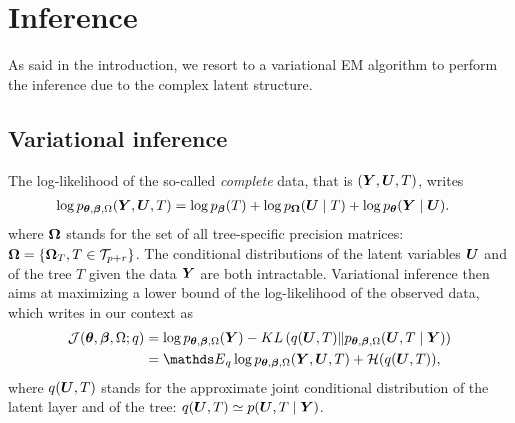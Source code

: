 \section{Inference} \label{sec:Inference}

As said in the introduction, we  resort to a variational EM algorithm to perform the inference due to the complex latent structure.

\subsection{Variational inference}

The log-likelihood of the so-called {\sl complete} data, that is $({\boldsymbol{Y}}, {\boldsymbol{U}}, T)$, writes
\begin{align*}
\log p_{{\boldsymbol{\theta}}, {\boldsymbol{\beta}}, \Omega}({\boldsymbol{Y}}, {\boldsymbol{U}}, T) 
& = \log p_{\boldsymbol{\beta}}(T) + \log p_{{\boldsymbol{\Omega}}}({\boldsymbol{U}} \mid T) + \log p_{\boldsymbol{\theta}}({\boldsymbol{Y}} \mid {\boldsymbol{U}}).
\end{align*}
where ${\boldsymbol{\Omega}}$ stands for the set of all tree-specific precision matrices: ${\boldsymbol{\Omega}} = \{{\boldsymbol{\Omega}}_T, T \in {\mathcal{T}}_{p+r}\}$.
The conditional distributions of the latent variables ${\boldsymbol{U}}$ and of the tree $T$ given the data ${\boldsymbol{Y}}$ are both intractable. Variational inference then aims at maximizing a lower bound of the log-likelihood of the observed data, which writes in our context as
\begin{align} \label{eq:lower-bound}
\Jcal(\thetabf, \betabf, \Omega; q)
& = \log p_{\thetabf, \betabf, \Omega}(\Ybf) 
- KL\left(q(\Ubf, T) \| p_{\thetabf, \betabf, \Omega}(\Ubf, T \mid \Ybf) \right) \\
& = \Esp_q \log p_{\thetabf, \betabf, \Omega}(\Ybf,\Ubf, T) + \Hcal(q(\Ubf, T)), \nonumber
\end{align}
where $q({\boldsymbol{U}},T)$ stands for the approximate joint conditional distribution of the latent layer and of the tree: $q({\boldsymbol{U}}, T) \simeq p({\boldsymbol{U}}, T \mid {\boldsymbol{Y}})$. 

